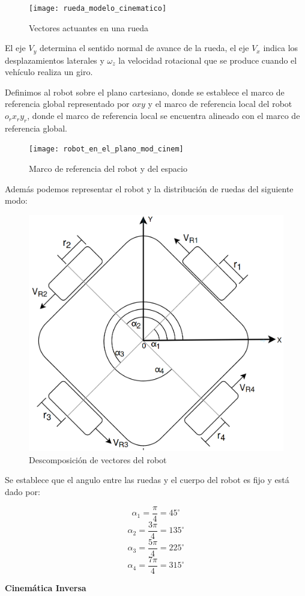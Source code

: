 \begin{figure}[H]
    \centering
    \texttt{[image: rueda\_modelo\_cinematico]}
    \caption{Vectores actuantes en una rueda}
    \label{fig:vectoresrueda}
\end{figure}

El eje $V_y$ determina el sentido normal de avance de la rueda, el eje $V_x$ indica los desplazamientos laterales y $\omega_z$ la velocidad rotacional que se produce cuando el vehículo realiza un giro.

Definimos al robot sobre el plano cartesiano, donde se establece el marco de referencia global representado por $oxy$ y el marco de referencia local del robot $o_rx_ry_r$, donde el marco de referencia local se encuentra alineado con el marco de referencia global.

\begin{figure}[H]
    \centering
    \texttt{[image: robot\_en\_el\_plano\_mod\_cinem]}
    \caption{Marco de referencia del robot y del espacio}
    \label{fig:marcorefrobotenelplano}
\end{figure}

Además podemos representar el robot y la distribución de ruedas del siguiente modo:

\begin{figure}[H]
    \centering
    \includegraphics[width=0.5\linewidth]{images/modelo_cinematico_robot_ruedas.png}
    \caption{Descomposición de vectores del robot}
    \label{fig:vectoresrobotmodelocinem}
\end{figure}

Se establece que el angulo entre las ruedas y el cuerpo del robot es fijo y está dado por:

$$ \alpha_1 = \frac{\pi}{4} = 45^{\circ} $$
$$ \alpha_2 = \frac{3\pi}{4} = 135^{\circ} $$
$$ \alpha_3 = \frac{5\pi}{4} = 225^{\circ} $$
$$ \alpha_4 = \frac{7\pi}{4} = 315^{\circ} $$

\textbf{Cinemática Inversa} \mbox{} \vspace{8pt}


